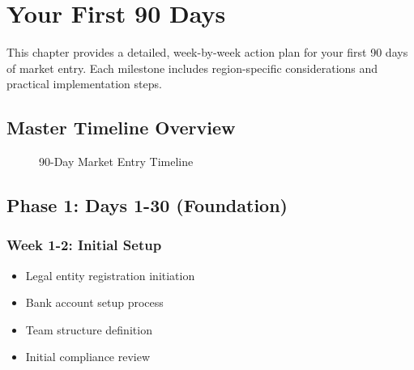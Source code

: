 
\chapter{Your First 90 Days}

\begin{importantbox}
This chapter provides a detailed, week-by-week action plan for your first 90 days of market entry. Each milestone includes region-specific considerations and practical implementation steps.
\end{importantbox}

\section{Master Timeline Overview}

\begin{figure}[h]
    \centering
    \caption{90-Day Market Entry Timeline}
\end{figure}

\section{Phase 1: Days 1-30 (Foundation)}

\subsection{Week 1-2: Initial Setup}
\begin{tcolorbox}[colback=white,colframe=primarydark,title=\textbf{Critical Tasks}]
\begin{itemize}
    \item Legal entity registration initiation
    \item Bank account setup process
    \item Team structure definition
    \item Initial compliance review
\end{itemize}
\end{tcolorbox}

